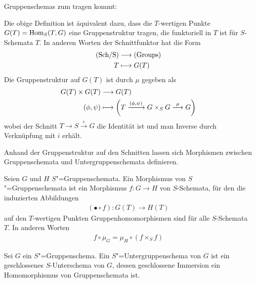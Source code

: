 Gruppenschemas zum tragen kommt:
\begin{Bemerkung}
  Die obige Definition ist äquivalent dazu, dass die $T$-wertigen Punkte
  $G(T)=\operatorname{Hom}_S(T,G)$ eine Gruppenstruktur tragen, die funktoriell in
  $T$ ist für $S$-Schemata $T$.
  In anderen Worten der Schnittfunktor hat die Form 
  \begin{align*}
    \text{(Sch/S)} &\longrightarrow \text{(Groups)}\\
    T &\longmapsto G(T)
  \end{align*}
  Die Gruppenstruktur auf $G(T)$ ist durch $\mu$ gegeben als
  \begin{align*}
    G(T)\times G(T) &\longrightarrow G(T)\\
    (\phi, \psi) &\longmapsto 
                   \left(
                   T\xrightarrow{(\phi,\psi)} G\times_S G
                   \overset{\mu}{\longrightarrow} G
                   \right)
  \end{align*}
  wobei der Schnitt $T\to S\xrightarrow{\epsilon} G$ die
  Identität ist und man Inverse durch Verknüpfung mit $i$ erhält.
\end{Bemerkung}

Anhand der Gruppenstruktur auf den Schnitten lassen sich
Morphismen zwischen Gruppenschemata und Untergruppenschemata
definieren.
\begin{Definition}
  Seien $G$ und $H$ $S$"=Gruppenschemata.
  Ein Morphismus von $S$"=Gruppenschemata ist ein Morphismus $f\colon
  G\to H$ von $S$-Schemata, für den die induzierten Abbildungen
  \begin{gather*}
    (\bullet\circ f)\colon G(T)\to H(T)
  \end{gather*}auf den $T$-wertigen Punkten
  Gruppenhomomorphismen sind für alle $S$-Schemata $T$.
  In anderen Worten
  \begin{gather*}
    f\circ\mu_G = \mu_H\circ(f\times_S f)
  \end{gather*}
\end{Definition}

\begin{Definition}[Untergruppenschema]
  Sei $G$ ein $S$"=Gruppenschema.
  Ein $S$"=Untergruppenschema von $G$ ist ein geschlossenes
  $S$-Unterschema von $G$, dessen geschlossene Immersion ein
  Homomorphismus von Gruppenschemata ist.
\end{Definition}

